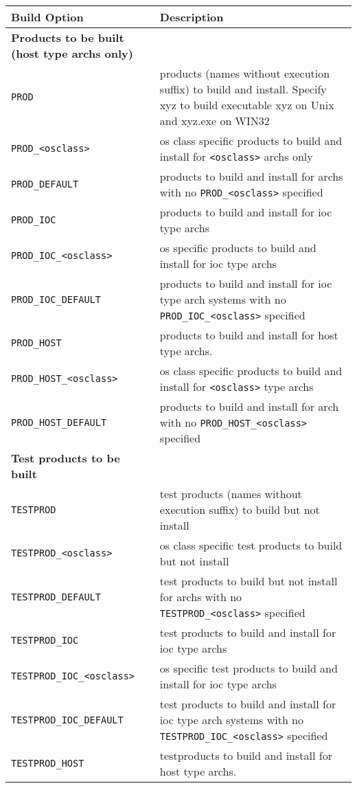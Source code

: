 \begin{center}
\begin{longtable}
{p{2.94784in}p{3.76247in}}
\textbf{Build Option} & \textbf{Description}\\
\hline \hline
\textbf{Products to be built (host type archs only)} & \\
\hline
\verb|PROD| & products (names without execution suffix) to build and install. Specify xyz to build executable xyz on Unix and xyz.exe on WIN32\\
\verb|PROD_<osclass>| & os class specific products to build and install for \verb|<osclass>| archs only\\
\verb|PROD_DEFAULT| & products to build and install for archs with no \verb|PROD_<osclass>| specified\\
\verb|PROD_IOC| & products to build and install for ioc type archs\\
\verb|PROD_IOC_<osclass>| & os specific products to build and install for ioc type archs\\
\verb|PROD_IOC_DEFAULT| & products to build and install for ioc type arch systems with no \verb|PROD_IOC_<osclass>| specified\\
\verb|PROD_HOST| & products to build and install for host type archs. \\
\verb|PROD_HOST_<osclass>| & os class specific products to build and install for \verb|<osclass>| type archs\\
\verb|PROD_HOST_DEFAULT| & products to build and install for arch with no \verb|PROD_HOST_<osclass>| specified\\
\textbf{Test products to be built} & \\
\hline
\verb|TESTPROD| & test products (names without execution suffix) to build but not install \\
\verb|TESTPROD_<osclass>| & os class specific test products to build but not install\\
\verb|TESTPROD_DEFAULT| & test products to build but not install for archs with no \verb|TESTPROD_<osclass>| specified\\
\verb|TESTPROD_IOC| & test products to build and install for ioc type archs\\
\verb|TESTPROD_IOC_<osclass>| & os specific test products to build and install for ioc type archs\\
\verb|TESTPROD_IOC_DEFAULT| & test products to build and install for ioc type arch systems with no \verb|TESTPROD_IOC_<osclass>| specified\\
\verb|TESTPROD_HOST| & testproducts to build and install for host type archs. \\

\end{longtable}
\end{center}
